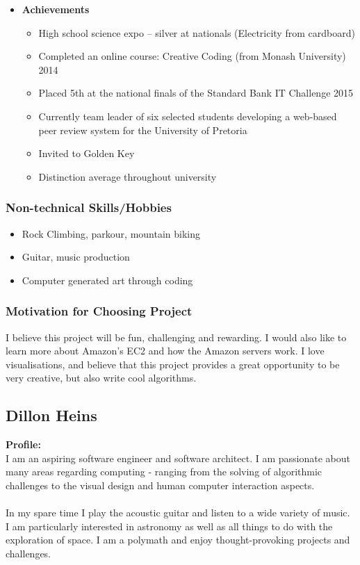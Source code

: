 \documentclass{article}
\begin{document}
\begin{itemize}
	\item \textbf{Achievements}
	\begin{itemize}
		\item High school science expo – silver at nationals (Electricity from cardboard)
		\item Completed an online course: Creative Coding (from Monash University) 2014
		\item Placed 5th at the national finals of the Standard Bank IT Challenge 2015
		\item Currently team leader of six selected students developing a web-based peer review system for the University of Pretoria
		\item Invited to Golden Key
		\item Distinction average throughout university
	\end{itemize}
\end{itemize}

\subsubsection{Non-technical Skills/Hobbies}
\begin{itemize}
	\item Rock Climbing, parkour, mountain biking
	\item Guitar, music production
	\item Computer generated art through coding
\end{itemize}
\subsubsection{Motivation for Choosing Project}
I believe this project will be fun, challenging and rewarding. I would also like to learn more about Amazon's EC2 and how the Amazon servers work. I love visualisations, and believe that this project provides a great opportunity to be very creative, but also write cool algorithms. 

\cleardoublepage

\subsection{Dillon Heins}
\textbf{Profile:}\\
I am an aspiring software engineer and software architect. I am passionate about many areas regarding computing - ranging from the solving of algorithmic challenges to the visual design and human computer interaction aspects.
\\\\	
In my spare time I play the acoustic guitar and listen to a wide variety of music. I am particularly interested in astronomy as well as all things to do with the exploration of space. I am a polymath and enjoy thought-provoking projects and challenges.
\end{document}
